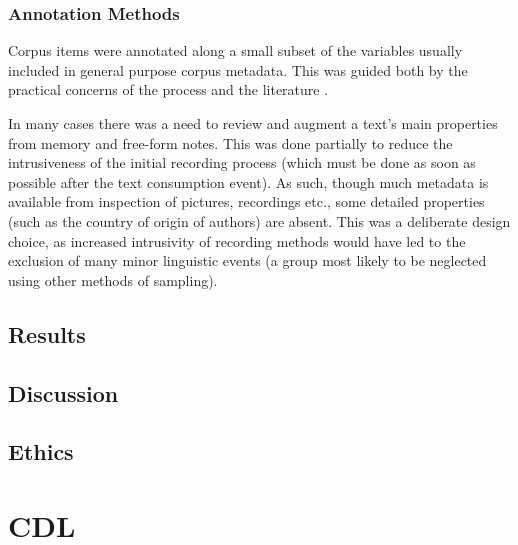 \subsubsection{Annotation Methods}
Corpus items were annotated along a small subset of the variables usually included in general purpose corpus metadata.  This was guided both by the practical concerns of the process and the literature %
.

In many cases there was a need to review and augment a text's main properties from memory and free-form notes.  This was done partially to reduce the intrusiveness of the initial recording process (which must be done as soon as possible after the text consumption event).  As such, though much metadata is available from inspection of pictures, recordings etc., some detailed properties (such as the country of origin of authors) are absent.  This was a deliberate design choice, as increased intrusivity of recording methods would have led to the exclusion of many minor linguistic events (a group most likely to be neglected using other methods of sampling).



\subsection{Results}

\subsection{Discussion}

\subsection{Ethics}













\section{CDL}


